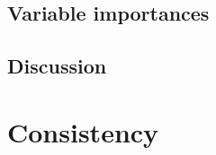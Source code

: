 
\subsection{Variable importances}


\subsection{Discussion}

%


\section{Consistency}
\label{sec:4:consistency}

